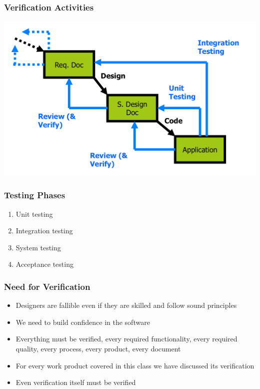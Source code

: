 \documentclass[t,12pt,numbers,fleqn]{beamer}
\begin{document}

\begin{frame}
\frametitle{Verification Activities}

\begin{center}
\includegraphics[scale=0.55]{../Figures/SoftwareLifecycle.png}
\end{center}

\end{frame}


\begin{frame}
\frametitle{Testing Phases}
\begin{enumerate}
\item Unit testing
\item Integration testing
\item System testing
\item Acceptance testing
\end{enumerate}
\end{frame}


\begin{frame}
\frametitle{Need for Verification}

\begin{itemize}

\item Designers are fallible even if they are skilled and follow sound principles
\item We need to build confidence in the software
\item Everything must be verified, every required functionality, every required
  quality, every process, every product, every document
\item For every work product covered in this class we have discussed its verification
\item Even verification itself must be verified

\end{itemize}

\end{frame}
\end{document}
